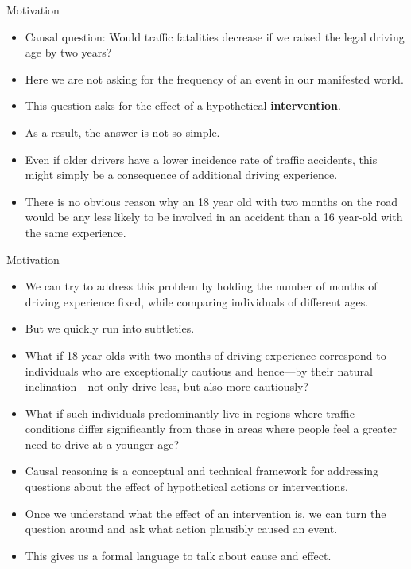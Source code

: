 \documentclass[handout]{beamer}
\begin{document}
\begin{frame}{Motivation}
\scriptsize{
\begin{itemize}
\item Causal question:  Would traffic fatalities decrease if we raised the legal driving age by two years? 
\item Here we are not asking for the frequency of an event in our manifested world.
\item This question asks for the effect of a hypothetical \textbf{intervention}.
\item As a result, the answer is not so simple. 
\item Even if older drivers have a lower incidence rate of traffic accidents, this might simply be a consequence of additional driving experience. 
\item There is no obvious reason why an 18 year old with two months on the road would be any less likely to be involved in an accident than a 16 year-old with the same experience.


\end{itemize}

} 

\end{frame}



\begin{frame}{Motivation}
\scriptsize{
\begin{itemize}
\item We can try to address this problem by holding the number of months of driving experience fixed, while comparing individuals of different ages.
\item But we quickly run into subtleties.
\item What if 18 year-olds with two months of driving experience correspond to individuals who are exceptionally cautious and hence—by their natural inclination—not only drive less, but also more cautiously?
\item What if such individuals predominantly live in regions where traffic conditions differ significantly from those in areas where people feel a greater need to drive at a younger age?

\item  Causal reasoning is a conceptual and technical framework for addressing questions about the effect of hypothetical actions or interventions. 
\item Once we understand what the effect of an intervention is, we can turn the question around and ask what action plausibly caused an event. 
\item This gives us a formal language to talk about cause and effect.


\end{itemize}

} 

\end{frame}
\end{document}
